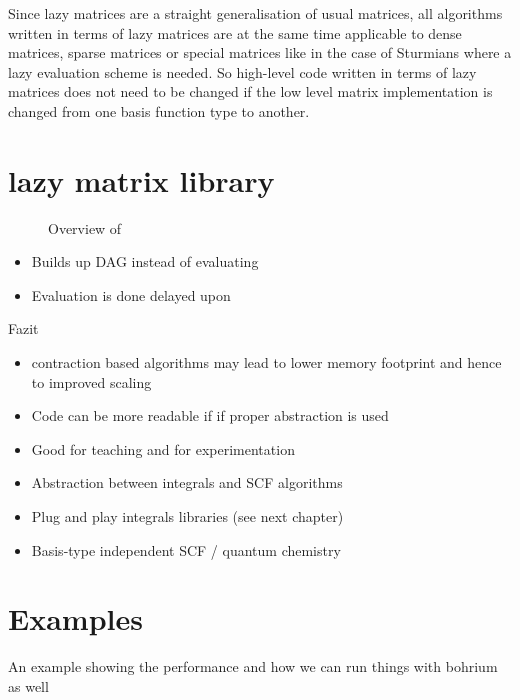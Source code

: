 Since lazy matrices are a straight generalisation
of usual matrices,
all algorithms written in terms of lazy matrices
are at the same time applicable to dense matrices,
sparse matrices or special matrices like in the case of Sturmians
where a lazy evaluation scheme is needed.
So high-level code written in terms of lazy matrices
does not need to be changed if the low level matrix implementation
is changed from one basis function type to another.


%



\section{\lazyten lazy matrix library}

\begin{figure}
	\centering
	\caption{Overview of \lazyten}
	\label{fig:structureLazyten}
\end{figure}




\begin{itemize}
	\item Builds up DAG instead of evaluating
	\item Evaluation is done delayed upon \contraction
	
\end{itemize}

Fazit
\begin{itemize}
	\item contraction based algorithms may lead to lower memory footprint and
		hence to improved scaling
	\item Code can be more readable if if proper abstraction is used
	\item Good for teaching and for experimentation
	\item Abstraction between integrals and SCF algorithms
	\item Plug and play integrals libraries (see next chapter)
	\item Basis-type independent SCF / quantum chemistry
\end{itemize}

\section{Examples}
An example showing the performance and how we can run things with bohrium as well
